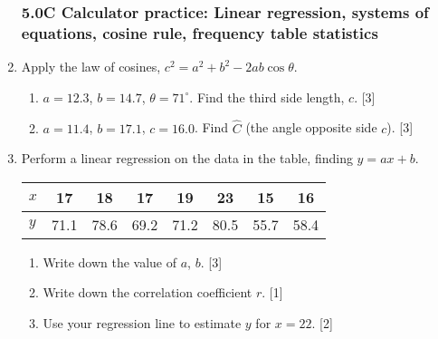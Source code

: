\documentclass[12pt, twoside]{article}
\begin{document}
\begin{enumerate}
    \subsubsection*{5.0C Calculator practice: Linear regression, systems of equations, cosine rule, frequency table statistics}

    \item Apply the law of cosines, $c^2=a^2+b^2-2ab \cos \theta$.
    \begin{enumerate}
        \item $a=12.3$, $b=14.7$, $\theta = 71^\circ$. Find the third side length, $c$. \hfill [3]
        \item $a=11.4$, $b=17.1$, $c=16.0$. Find $\hat{C}$ (the angle opposite side $c$). \hfill [3]
    \end{enumerate}

    \item Perform a linear regression on the data in the table, finding $y=ax+b$. 
            \begin{center}
            \begin{tabular}{|l|c|c|c|c|c|c|c|}
                \hline
                $x$ & 17 & 18 & 17 & 19 & 23 & 15 & 16 \\ 
                \hline 
                $y$ & 71.1 & 78.6 & 69.2 & 71.2 & 80.5 & 55.7 & 58.4 \\ 
                \hline 
                \end{tabular}
            \end{center}
            \begin{enumerate}
                \item Write down the value of $a$, $b$. \hfill [3]%
                \item Write down the correlation coefficient $r$. \hfill [1] %
                \item Use your regression line to estimate $y$ for $x=22$. \hfill [2] %
            \end{enumerate}
        

\end{enumerate}
\end{document}

